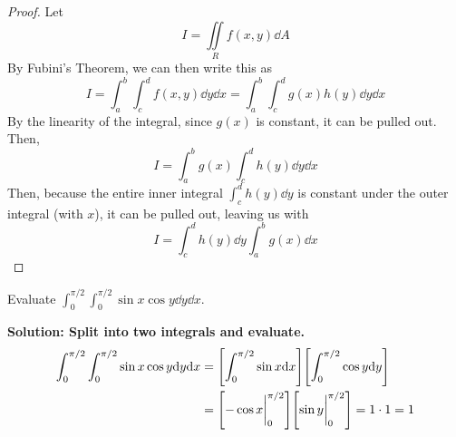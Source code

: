 \begin{proof}
    Let
    \[ I = \iint\limits_Rf(x,y)\dd A \]
    By Fubini's Theorem, we can then write this as
    \[ I = \int_a^b\int_c^df(x,y)\dd y\dd x = \int_a^b\int_c^dg(x)h(y)\dd y\dd x\]
    By the linearity of the integral, since \( g(x) \) is constant, it can be pulled out. Then,
    \[ I = \int_a^b g(x)\int_c^d h(y)\dd y\dd x\]
    Then, because the entire inner integral \( \int_c^dh(y)\dd y \) is constant under the outer integral (with \( x \)), it can be pulled out, leaving us with
    \[ I = \int_c^dh(y)\dd y \int_a^bg(x)\dd x\]
\end{proof}
\begin{example}
    Evaluate \( \int_0^{\pi/2}\int_0^{\pi/2}\sin x\cos y \dd y \dd x \). \par
    \bf{Solution: }Split into two integrals and evaluate.
    \begin{align*}
        \int_0^{\pi/2}\int_0^{\pi/2}\sin x\cos y \dd y \dd x &= \bqty{\int_0^{\pi/2}\sin x\dd x}\bqty{\int_0^{\pi/2}\cos y\dd y} \\
        &= \bqty{-\cos x\biggr|_{0}^{\pi/2}}\bqty{\sin y\biggr|_{0}^{\pi/2}} = 1\cdot 1 = 1
    \end{align*}
\end{example}
